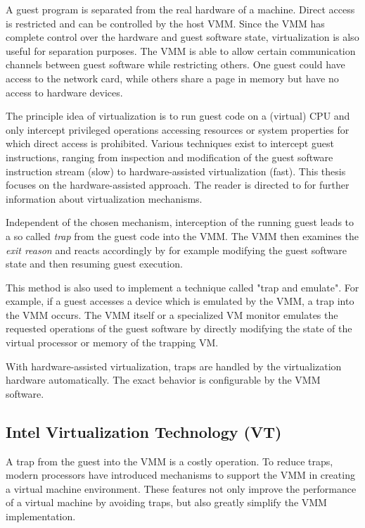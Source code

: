 A guest program is separated from the real hardware of a machine. Direct access
is restricted and can be controlled by the host VMM. Since the VMM has complete
control over the hardware and guest software state, virtualization is also
useful for separation purposes. The VMM is able to allow certain communication
channels between guest software while restricting others. One guest could have
access to the network card, while others share a page in memory but have no
access to hardware devices.

The principle idea of virtualization is to run guest code on a (virtual)
CPU and only intercept privileged operations accessing resources or
system properties for which direct access is prohibited. Various techniques
exist to intercept guest instructions, ranging from inspection and modification
of the guest software instruction stream (slow) to hardware-assisted
virtualization (fast). This thesis focuses on the hardware-assisted approach.
The reader is directed to \cite{VMware:virtualization} for further information
about virtualization mechanisms.

Independent of the chosen mechanism, interception of the running guest leads to
a so called \emph{trap} from the guest code into the VMM. The VMM
then examines the \emph{exit reason} and reacts accordingly
by for example modifying the guest software state and then resuming guest
execution.

This method is also used to implement a technique called "trap and emulate".
For example, if a guest accesses a device which is emulated by the VMM, a trap
into the VMM occurs. The VMM itself or a specialized VM monitor emulates the
requested operations of the guest software by directly modifying the state of
the virtual processor or memory of the trapping VM.

With hardware-assisted virtualization, traps are handled by the virtualization
hardware automatically. The exact behavior is configurable by the VMM software.

\subsection{Intel Virtualization Technology (VT)}
A trap from the guest into the VMM is a costly operation. To reduce traps,
modern processors have introduced mechanisms to support the VMM in creating a
virtual machine environment. These features not only improve the performance of
a virtual machine by avoiding traps, but also greatly simplify the VMM
implementation.

